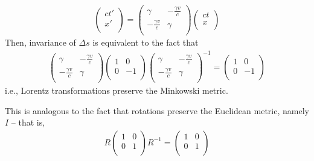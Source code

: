 \documentclass{../../template/note}
\begin{document}
    \begin{align*}
        \begin{pmatrix}
         ct' \\
         x' \\
        \end{pmatrix} = \begin{pmatrix}
         \gamma & -\frac{\gamma v}{c} \\
         -\frac{\gamma v}{c} & \gamma \\
        \end{pmatrix}\begin{pmatrix}
         ct \\
         x \\
        \end{pmatrix}
    \end{align*}
    Then, invariance of \(\Delta s\) is equivalent to the fact that
    \begin{align*}
        \begin{pmatrix}
         \gamma & -\frac{\gamma v}{c} \\
         -\frac{\gamma v}{c} & \gamma \\
        \end{pmatrix}\begin{pmatrix}
         1 & 0 \\
         0 & -1 \\
        \end{pmatrix} \begin{pmatrix}
         \gamma & -\frac{\gamma v}{c} \\
         -\frac{\gamma v}{c} & \gamma \\
        \end{pmatrix}^{-1} = \begin{pmatrix}
         1 & 0 \\
         0 & -1 \\
        \end{pmatrix}
    \end{align*}
    i.e., Lorentz transformations preserve the Minkowski metric.

    \begin{remark*}
        This is analogous to the fact that rotations preserve the Euclidean metric, namely \(I\) -- that is,
        \begin{align*}
            R\begin{pmatrix}
             1 & 0 \\
             0 & 1 \\
            \end{pmatrix} R^{-1} = \begin{pmatrix}
             1 & 0 \\
             0 & 1 \\
            \end{pmatrix}
        \end{align*}
    \end{remark*}
    
\end{document}
